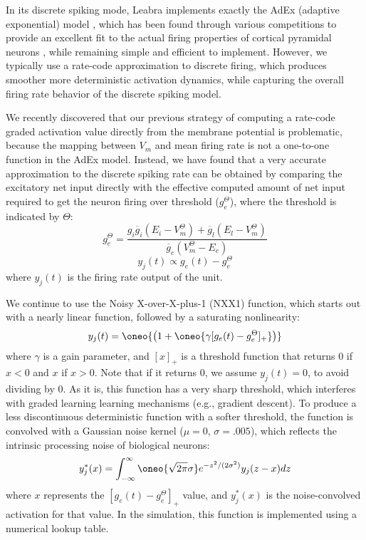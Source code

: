 In its discrete spiking mode, Leabra implements exactly the AdEx (adaptive exponential) model \cite{BretteGerstner05}, which has been found through various competitions to provide an excellent fit to the actual firing properties of cortical pyramidal neurons \cite{GerstnerNaud09}, while remaining simple and efficient to implement. However, we typically use a rate-code approximation to discrete firing, which produces smoother more deterministic activation dynamics, while capturing the overall firing rate behavior of the discrete spiking model.

We recently discovered that our previous strategy of computing a rate-code graded activation value directly from the membrane potential is problematic, because the mapping between $V_m$ and mean firing rate is not a one-to-one function in the AdEx model. Instead, we have found that a very accurate approximation to the discrete spiking rate can be obtained by comparing the excitatory net input directly with the effective computed amount of net input required to get the neuron firing over threshold ($g_e^{\Theta}$), where the threshold is indicated by $\Theta$:
\begin{equation}
g_e^{\Theta} = \frac{g_i \overline{g}_i (E_i - V_m^{\Theta}) +
 \overline{g}_l(E_l - V_m^{\Theta})} {\overline{g}_e (V_m^{\Theta} - E_e)}
\end{equation}
\begin{equation}
 y_j(t) \propto g_e(t) - g_e^{\Theta}
\end{equation}
where $y_j(t)$ is the firing rate output of the unit.

We continue to use the Noisy X-over-X-plus-1 (NXX1) function, which starts out with a nearly linear function, followed by a saturating nonlinearity:
\begin{equation}
 y_j(t) = \oneo{\left(1 + \oneo{\gamma [g_e(t) - g_e^{\Theta}]_+} \right)}
\end{equation}
where $\gamma$ is a gain parameter, and $[x]_+$ is a threshold function that returns 0 if $x<0$ and $x$ if $x>0$. Note that if it returns 0, we assume $y_j(t) = 0$, to avoid dividing by 0. As it is, this function has a very sharp threshold, which interferes with graded learning learning mechanisms (e.g., gradient descent). To produce a less discontinuous deterministic function with a softer threshold, the function is convolved with a Gaussian noise kernel ($\mu=0$, $\sigma=.005$), which reflects the intrinsic processing noise of biological neurons:
\begin{equation}
 y^*_j(x) = \int_{-\infty}^{\infty} \oneo{\sqrt{2 \pi} \sigma}
 e^{-z^2/(2 \sigma^2)} y_j(z-x) dz
 \label{eq.conv}
\end{equation}
where $x$ represents the $[g_e(t) - g_e^{\Theta}]_+$ value, and $y^*_j(x)$ is the noise-convolved activation for that value. In the simulation, this function is implemented using a numerical lookup table.

